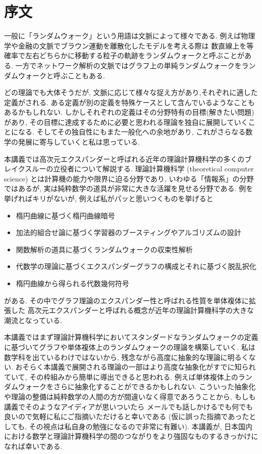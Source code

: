 \chapter*{序文}
一般に「ランダムウォーク」という用語は文脈によって様々である.
例えば物理学や金融の文脈でブラウン運動を離散化したモデルを考える際は
数直線上を等確率で左右どちらかに移動する粒子の軌跡をランダムウォークと呼ぶことがある.
一方でネットワーク解析の文脈ではグラフ上の単純ランダムウォークをランダムウォークと呼ぶこともある.

どの理論でも大体そうだが, 文脈に応じて様々な捉え方があり,それぞれに適した定義がされる.
ある定義が別の定義を特殊ケースとして含んでいるようなこともあるかもしれない.
しかしそれぞれの定義はその分野特有の目標(解きたい問題)があり,
    その目標に達成するために必要と思われる理論を独自に展開していくことになる.
    そしてその独自性にもまた一般化への余地があり,
    これがさらなる数学の発展に寄与していくと私は思っている.

本講義では高次元エクスパンダーと呼ばれる近年の理論計算機科学の多くのブレイクスルーの立役者について解説する.
理論計算機科学 (theoretical computer science) とは計算機の能力や限界に迫る分野であり, いわゆる「情報系」の分野ではあるが,
    実は純粋数学の道具が非常に大きな活躍を見せる分野である.
例を挙げればキリがないが, 例えば私がパッと思いつくものを挙げると
\begin{itemize}
    \item 楕円曲線に基づく楕円曲線暗号
    \item 加法的組合せ論に基づく学習器のブースティングやアルゴリズムの設計
    \item 関数解析の道具に基づくランダムウォークの収束性解析
    \item 代数学の理論に基づくエクスパンダーグラフの構成とそれに基づく脱乱択化
    \item 楕円曲線から得られる代数幾何符号
\end{itemize}
がある.
その中でグラフ理論のエクスパンダー性と呼ばれる性質を単体複体に拡張した
    高次元エクスパンダーと呼ばれる概念が近年の理論計算機科学の大きな潮流となっている.

本講義ではまず理論計算機科学においてスタンダードなランダムウォークの定義に基づいてグラフや単体複体上のランダムウォークの理論を構築していく.
私は数学科を出ているわけではないから, 残念ながら高度に抽象的な理論に明るくない.
おそらく本講義で展開される理論の一部はより高度な抽象化がすでに知られていて, その枠組みから簡単に導出できると思われる.
例えば単体複体上のランダムウォークをさらに抽象化することができるかもしれない.
こういった抽象化や理論の整備は純粋数学の人間の方が間違いなく得意であろうことから,
もしも講義でそのようなアイディアが思いついたら
メールでも話しかけるでも何でも良いので気軽に私にご指摘いただけると幸いである
(仮に誤った指摘であったとしても, その視点は私自身の勉強になるので非常に有難い).
本講義が, 日本国内における数学と理論計算機科学の間のつながりをより強固なものするきっかけになれば幸いである.